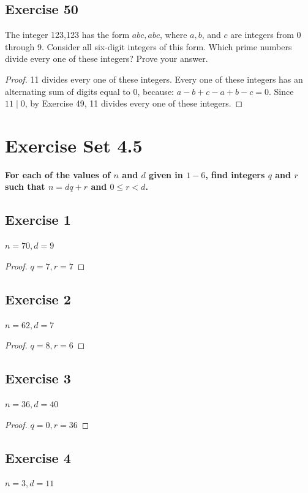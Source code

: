 \documentclass[14pt]{extarticle}
\newcommand{\cy}{\color{cyan}}
\begin{document}
\subsection{Exercise 50}
The integer 123,123 has the form $abc,abc$, where $a, b$, and $c$ are integers from 0 through 9. Consider all six-digit integers of this form. Which prime numbers divide every one of these integers? Prove your answer.

\begin{proof}
11 divides every one of these integers. Every one of these integers has an alternating sum of digits equal to 0, because: $a - b + c - a + b - c = 0$. Since $11 \mid 0$, by Exercise 49, 11 divides every one of these integers.
\end{proof}

\section{Exercise Set 4.5}

{\bf \cy For each of the values of $n$ and $d$ given in $1-6$, find integers $q$ and $r$ such that $n = dq + r$ and $0 \leq r < d$.}

\subsection{Exercise 1}
$n = 70, d = 9$

\begin{proof}
$q = 7, r = 7$
\end{proof}

\subsection{Exercise 2}
$n = 62, d = 7$

\begin{proof}
$q = 8, r = 6$
\end{proof}

\subsection{Exercise 3}
$n = 36, d = 40$

\begin{proof}
$q = 0, r = 36$
\end{proof}

\subsection{Exercise 4}
$n = 3, d = 11$
\end{document}
